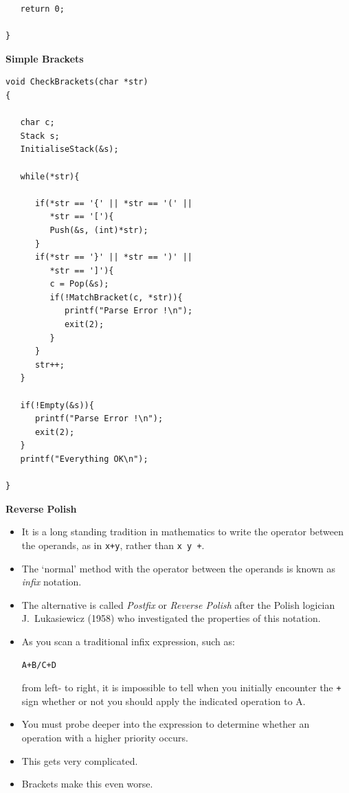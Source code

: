 \documentclass[a4,portraitt]{slides}
\begin{document}
{{{\begin{verbatim}
   return 0;

}
\end{verbatim}
}}

\newpage
{\samepage
\begin{center}
{\Large{\bf Simple Brackets}}
\end{center}
{\small
\begin{verbatim}
void CheckBrackets(char *str)
{

   char c;
   Stack s;
   InitialiseStack(&s);

   while(*str){

      if(*str == '{' || *str == '(' ||
         *str == '['){
         Push(&s, (int)*str);
      }
      if(*str == '}' || *str == ')' ||
         *str == ']'){
         c = Pop(&s);
         if(!MatchBracket(c, *str)){
            printf("Parse Error !\n");
            exit(2);
         }
      }
      str++;
   }

   if(!Empty(&s)){
      printf("Parse Error !\n");
      exit(2);
   }
   printf("Everything OK\n");

}
\end{verbatim}
}}

\newpage
{\samepage
\begin{center}
{\Large{\bf Reverse Polish}}
\end{center}
{\small
\begin{itemize}
\item It is a long standing tradition in mathematics to write the operator
between the operands, as in \verb^x+y^, rather than \verb^x y +^.
\item The `normal' method with the operator between the operands is
known as {\it infix} notation.
\item The alternative is called {\it Postfix} or {\it Reverse Polish}
after the Polish logician J.\ Lukasiewicz (1958) who investigated the
properties of this notation.
\item As you scan a traditional infix expression, such as:
\begin{verbatim}
A+B/C+D
\end{verbatim}
from left- to right, it is impossible to tell when you initially encounter the \verb^+^ sign whether or not you should apply the indicated operation to
A.
\item You must probe deeper into the expression to determine whether an operation with a higher priority occurs.
\item This gets very complicated.
\item Brackets make this even worse.
\end{itemize}
}}

}
\end{document}
